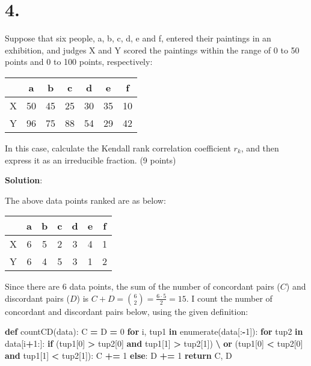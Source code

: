 \documentclass[
]{article}
\newenvironment{Shaded}{\begin{snugshade}}{\end{snugshade}}
\newcommand{\BuiltInTok}[1]{#1}
\newcommand{\ControlFlowTok}[1]{\textcolor[rgb]{0.13,0.29,0.53}{\textbf{#1}}}
\newcommand{\DecValTok}[1]{\textcolor[rgb]{0.00,0.00,0.81}{#1}}
\newcommand{\KeywordTok}[1]{\textcolor[rgb]{0.13,0.29,0.53}{\textbf{#1}}}
\newcommand{\NormalTok}[1]{#1}
\newcommand{\OperatorTok}[1]{\textcolor[rgb]{0.81,0.36,0.00}{\textbf{#1}}}
\begin{document}
\hypertarget{section-3}{%
\section{4.}\label{section-3}}

Suppose that six people, a, b, c, d, e and f, entered their paintings in
an exhibition, and judges X and Y scored the paintings within the range
of 0 to 50 points and 0 to 100 points, respectively:

\begin{tabular}{|c|c|c|c|c|c|c|}
\hline
&a&b&c&d&e&f\\
\hline
X&50&45&25&30&35&10\\
\hline
Y&96&75&88&54&29&42 \\
\hline
\end{tabular}

In this case, calculate the Kendall rank correlation coefficient
\(r_k\), and then express it as an irreducible fraction. (9 points)

\textbf{Solution}:

The above data points ranked are as below:

\begin{tabular}{|c|c|c|c|c|c|c|}
\hline
&a&b&c&d&e&f\\
\hline
X&6&5&2&3&4&1\\
\hline
Y&6&4&5&3&1&2 \\
\hline
\end{tabular}

Since there are 6 data points, the sum of the number of concordant pairs
(\(C\)) and discordant pairs (\(D\)) is
\(C + D = {6\choose 2} = \frac{6\cdot 5}{2} = 15\). I count the number
of concordant and discordant pairs below, using the given definition:

\begin{Shaded}
\begin{Highlighting}[]
\KeywordTok{def}\NormalTok{ countCD(data):}
\NormalTok{  C }\OperatorTok{=}\NormalTok{ D }\OperatorTok{=} \DecValTok{0}
  \ControlFlowTok{for}\NormalTok{ i, tup1 }\KeywordTok{in} \BuiltInTok{enumerate}\NormalTok{(data[:}\OperatorTok{-}\DecValTok{1}\NormalTok{]):}
    \ControlFlowTok{for}\NormalTok{ tup2 }\KeywordTok{in}\NormalTok{ data[i}\OperatorTok{+}\DecValTok{1}\NormalTok{:]:}
      \ControlFlowTok{if}\NormalTok{ (tup1[}\DecValTok{0}\NormalTok{] }\OperatorTok{>}\NormalTok{ tup2[}\DecValTok{0}\NormalTok{] }\KeywordTok{and}\NormalTok{ tup1[}\DecValTok{1}\NormalTok{] }\OperatorTok{>}\NormalTok{ tup2[}\DecValTok{1}\NormalTok{]) }\OperatorTok{\textbackslash{}}
      \KeywordTok{or}\NormalTok{ (tup1[}\DecValTok{0}\NormalTok{] }\OperatorTok{<}\NormalTok{ tup2[}\DecValTok{0}\NormalTok{] }\KeywordTok{and}\NormalTok{ tup1[}\DecValTok{1}\NormalTok{] }\OperatorTok{<}\NormalTok{ tup2[}\DecValTok{1}\NormalTok{]):}
\NormalTok{        C }\OperatorTok{+=} \DecValTok{1}
      \ControlFlowTok{else}\NormalTok{:}
\NormalTok{        D }\OperatorTok{+=} \DecValTok{1}
  \ControlFlowTok{return}\NormalTok{ C, D}
\end{Highlighting}
\end{Shaded}
\end{document}
